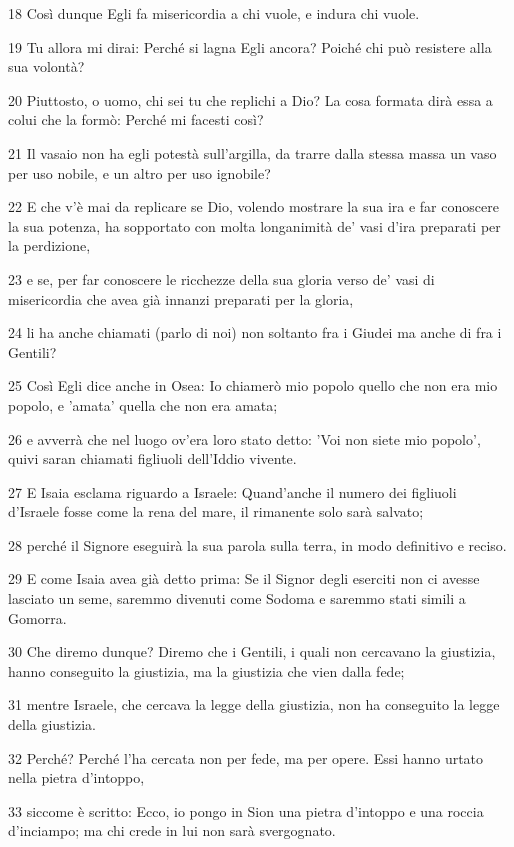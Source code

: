 \par 18 Così dunque Egli fa misericordia a chi vuole, e indura chi vuole.
\par 19 Tu allora mi dirai: Perché si lagna Egli ancora? Poiché chi può resistere alla sua volontà?
\par 20 Piuttosto, o uomo, chi sei tu che replichi a Dio? La cosa formata dirà essa a colui che la formò: Perché mi facesti così?
\par 21 Il vasaio non ha egli potestà sull'argilla, da trarre dalla stessa massa un vaso per uso nobile, e un altro per uso ignobile?
\par 22 E che v'è mai da replicare se Dio, volendo mostrare la sua ira e far conoscere la sua potenza, ha sopportato con molta longanimità de' vasi d'ira preparati per la perdizione,
\par 23 e se, per far conoscere le ricchezze della sua gloria verso de' vasi di misericordia che avea già innanzi preparati per la gloria,
\par 24 li ha anche chiamati (parlo di noi) non soltanto fra i Giudei ma anche di fra i Gentili?
\par 25 Così Egli dice anche in Osea: Io chiamerò mio popolo quello che non era mio popolo, e 'amata' quella che non era amata;
\par 26 e avverrà che nel luogo ov'era loro stato detto: 'Voi non siete mio popolo', quivi saran chiamati figliuoli dell'Iddio vivente.
\par 27 E Isaia esclama riguardo a Israele: Quand'anche il numero dei figliuoli d'Israele fosse come la rena del mare, il rimanente solo sarà salvato;
\par 28 perché il Signore eseguirà la sua parola sulla terra, in modo definitivo e reciso.
\par 29 E come Isaia avea già detto prima: Se il Signor degli eserciti non ci avesse lasciato un seme, saremmo divenuti come Sodoma e saremmo stati simili a Gomorra.
\par 30 Che diremo dunque? Diremo che i Gentili, i quali non cercavano la giustizia, hanno conseguito la giustizia, ma la giustizia che vien dalla fede;
\par 31 mentre Israele, che cercava la legge della giustizia, non ha conseguito la legge della giustizia.
\par 32 Perché? Perché l'ha cercata non per fede, ma per opere. Essi hanno urtato nella pietra d'intoppo,
\par 33 siccome è scritto: Ecco, io pongo in Sion una pietra d'intoppo e una roccia d'inciampo; ma chi crede in lui non sarà svergognato.

